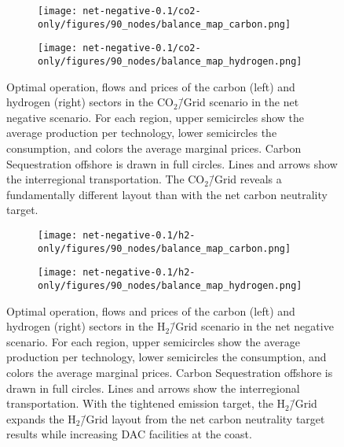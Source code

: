 \documentclass[twocolumn]{article}
\newcommand{\carbongrid}{CO$_2$\=/Grid}
\newcommand{\hydrogengrid}{H$_2$\=/Grid}
\newcommand{\carbonscenario}{CO$_2$\=/Grid scenario}
\newcommand{\hydrogenscenario}{H$_2$\=/Grid scenario}
\begin{document}
\begin{figure}[ht!]
    \centering
    \begin{subfigure}{.5\textwidth}
        \centering
        \texttt{[image: net-negative-0.1/co2-only/figures/90\_nodes/balance\_map\_carbon.png]}
        \label{fig:balance_map_carbon_co2_nn}
    \end{subfigure}%
    \begin{subfigure}{.5\textwidth}
        \centering
        \texttt{[image: net-negative-0.1/co2-only/figures/90\_nodes/balance\_map\_hydrogen.png]}
        \label{fig:balance_map_hydrogen_co2_nn}
    \end{subfigure}
    \caption{Optimal operation, flows and prices of the carbon (left) and hydrogen (right) sectors in the \carbonscenario{} in the net negative scenario. For each region, upper semicircles show the average production per technology, lower semicircles the consumption, and colors the average marginal prices. Carbon Sequestration offshore is drawn in full circles. Lines and arrows show the interregional transportation. The \carbongrid{} reveals a fundamentally different layout than with the net carbon neutrality target.
    }
    \label{fig:balance_maps_co2_nn}
\end{figure}

\begin{figure}[ht!]
    \centering
    \begin{subfigure}{.5\textwidth}
        \centering
        \texttt{[image: net-negative-0.1/h2-only/figures/90\_nodes/balance\_map\_carbon.png]}
        \label{fig:balance_map_carbon_h2_nn}
    \end{subfigure}%
    \begin{subfigure}{.5\textwidth}
        \centering
        \texttt{[image: net-negative-0.1/h2-only/figures/90\_nodes/balance\_map\_hydrogen.png]}
        \label{fig:balance_map_hydrogen_h2_nn}
    \end{subfigure}
    \caption{Optimal operation, flows and prices of the carbon (left) and hydrogen (right) sectors in the \hydrogenscenario{} in the net negative scenario. For each region, upper semicircles show the average production per technology, lower semicircles the consumption, and colors the average marginal prices. Carbon Sequestration offshore is drawn in full circles. Lines and arrows show the interregional transportation. With the tightened emission target, the \hydrogengrid{} expands the \hydrogengrid{} layout from the net carbon neutrality target results while increasing DAC facilities at the coast.
    }
    \label{fig:balance_maps_h2_nn}
\end{figure}
\end{document}
